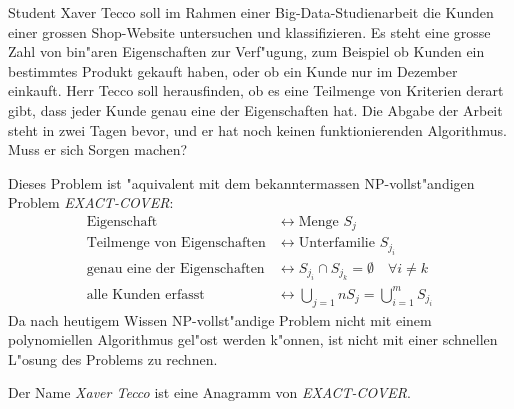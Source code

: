 Student Xaver Tecco soll im Rahmen einer Big-Data-Studienarbeit die 
Kunden einer grossen Shop-Website untersuchen und klassifizieren.
Es steht eine grosse Zahl von bin"aren Eigenschaften zur Verf"ugung,
zum Beispiel ob Kunden ein bestimmtes Produkt gekauft haben, oder
ob ein Kunde nur im Dezember einkauft.
Herr Tecco soll herausfinden, ob es eine Teilmenge von Kriterien derart
gibt, dass jeder Kunde genau eine der Eigenschaften hat.
Die Abgabe der Arbeit steht in zwei Tagen bevor, und er hat noch keinen
funktionierenden Algorithmus.
Muss er sich Sorgen machen?

\begin{loesung}
Dieses Problem ist "aquivalent mit dem bekanntermassen NP-vollst"andigen
Problem \textsl{EXACT-COVER}:
\begin{align*}
\text{Eigenschaft}&\leftrightarrow \text{Menge $S_j$}\\
\text{Teilmenge von Eigenschaften}&\leftrightarrow \text{Unterfamilie $S_{j_i}$}\\
\text{genau eine der Eigenschaften}&\leftrightarrow S_{j_i}\cap S_{j_k}=\emptyset\quad\forall i\ne k\\
\text{alle Kunden erfasst}&\leftrightarrow \bigcup_{j=1} nS_j=\bigcup_{i=1}^m S_{j_i}
\end{align*}
Da nach heutigem Wissen NP-vollst"andige Problem nicht mit einem polynomiellen
Algorithmus gel"ost werden k"onnen, ist nicht mit einer schnellen L"osung
des Problems zu rechnen.
\end{loesung}

\begin{diskussion}
Der Name \textsl{Xaver Tecco} ist eine Anagramm von \textsl{EXACT-COVER}.
\end{diskussion}


